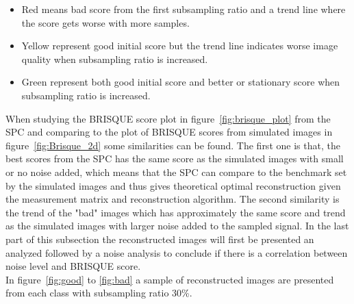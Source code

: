 \begin{itemize}
\item Red means bad score from the first subsampling ratio and a trend line where the score gets worse with more samples.
\item Yellow represent good initial score but the trend line indicates worse image quality when subsampling ratio is increased.
\item Green represent both good initial score and better or stationary score when subsampling ratio is increased. 
\end{itemize}

When studying the BRISQUE score plot in figure~\ref{fig:brisque_plot} from the SPC and comparing to the plot of BRISQUE scores from simulated images in figure~\ref{fig:Brisque_2d} some similarities can be found. The first one is that, the best scores from the SPC has the same score as the simulated images with small or no noise added, which means that the SPC can compare to the benchmark set by the simulated images and thus gives theoretical optimal reconstruction given the measurement matrix and reconstruction algorithm. The second similarity is the trend of the "bad" images which has approximately the same score and trend as the simulated images with larger noise added to the sampled signal. In the last part of this subsection the reconstructed images will first be presented an analyzed followed by a noise analysis to conclude if there is a correlation between noise level and BRISQUE score.\\[0.1in] 


In figure~\ref{fig:good} to \ref{fig:bad} a sample of reconstructed  images are presented from each class with subsampling ratio 30\%. 




